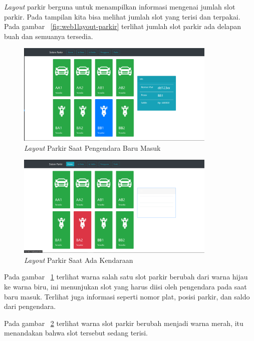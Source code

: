 \textit{Layout} parkir berguna untuk menampilkan informasi mengenai jumlah slot parkir. Pada tampilan kita bisa melihat jumlah slot yang terisi dan terpakai. Pada gambar ~\ref{fig:web1layout-parkir} terlihat jumlah slot parkir ada delapan buah dan semuanya tersedia.\newline

\begin{figure} [H]
    \includegraphics[width=0.85\textwidth, center]{images/web 1 layout parkir baru masuk.png}
    \caption{\textit{Layout} Parkir Saat Pengendara Baru Masuk}
    \label{fig:web1layout-parkir-baru-masuk}
\end{figure}

\begin{figure} [H]
    \includegraphics[width=0.85\textwidth, center]{images/web 1 layout parkir ada kendaraan.png}
    \caption{\textit{Layout} Parkir Saat Ada Kendaraan}
    \label{fig:web1layout-parkir-ada-kendaraan}
\end{figure}

Pada gambar ~\ref{fig:web1layout-parkir-baru-masuk} terlihat warna salah satu slot parkir berubah dari warna hijau ke warna biru, ini menunjukan slot yang harus diisi oleh pengendara pada saat baru masuk. Terlihat juga informasi seperti nomor plat, posisi parkir, dan saldo dari pengendara.

Pada gambar ~\ref{fig:web1layout-parkir-ada-kendaraan} terlihat warna slot parkir berubah menjadi warna merah, itu menandakan bahwa slot tersebut sedang terisi.


